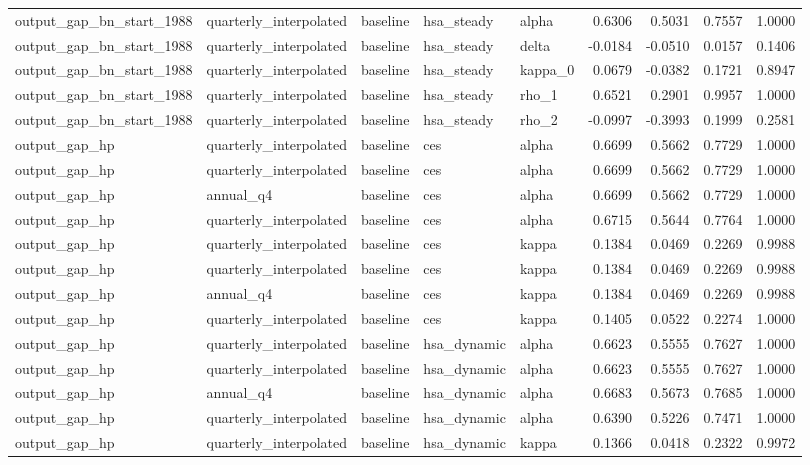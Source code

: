 \begin{tabular}{lllllrrrr}
output\_gap\_bn\_start\_1988 & quarterly\_interpolated & baseline & hsa\_steady & alpha & 0.6306 & 0.5031 & 0.7557 & 1.0000 \\
output\_gap\_bn\_start\_1988 & quarterly\_interpolated & baseline & hsa\_steady & delta & -0.0184 & -0.0510 & 0.0157 & 0.1406 \\
output\_gap\_bn\_start\_1988 & quarterly\_interpolated & baseline & hsa\_steady & kappa\_0 & 0.0679 & -0.0382 & 0.1721 & 0.8947 \\
output\_gap\_bn\_start\_1988 & quarterly\_interpolated & baseline & hsa\_steady & rho\_1 & 0.6521 & 0.2901 & 0.9957 & 1.0000 \\
output\_gap\_bn\_start\_1988 & quarterly\_interpolated & baseline & hsa\_steady & rho\_2 & -0.0997 & -0.3993 & 0.1999 & 0.2581 \\
output\_gap\_hp & quarterly\_interpolated & baseline & ces & alpha & 0.6699 & 0.5662 & 0.7729 & 1.0000 \\
output\_gap\_hp & quarterly\_interpolated & baseline & ces & alpha & 0.6699 & 0.5662 & 0.7729 & 1.0000 \\
output\_gap\_hp & annual\_q4 & baseline & ces & alpha & 0.6699 & 0.5662 & 0.7729 & 1.0000 \\
output\_gap\_hp & quarterly\_interpolated & baseline & ces & alpha & 0.6715 & 0.5644 & 0.7764 & 1.0000 \\
output\_gap\_hp & quarterly\_interpolated & baseline & ces & kappa & 0.1384 & 0.0469 & 0.2269 & 0.9988 \\
output\_gap\_hp & quarterly\_interpolated & baseline & ces & kappa & 0.1384 & 0.0469 & 0.2269 & 0.9988 \\
output\_gap\_hp & annual\_q4 & baseline & ces & kappa & 0.1384 & 0.0469 & 0.2269 & 0.9988 \\
output\_gap\_hp & quarterly\_interpolated & baseline & ces & kappa & 0.1405 & 0.0522 & 0.2274 & 1.0000 \\
output\_gap\_hp & quarterly\_interpolated & baseline & hsa\_dynamic & alpha & 0.6623 & 0.5555 & 0.7627 & 1.0000 \\
output\_gap\_hp & quarterly\_interpolated & baseline & hsa\_dynamic & alpha & 0.6623 & 0.5555 & 0.7627 & 1.0000 \\
output\_gap\_hp & annual\_q4 & baseline & hsa\_dynamic & alpha & 0.6683 & 0.5673 & 0.7685 & 1.0000 \\
output\_gap\_hp & quarterly\_interpolated & baseline & hsa\_dynamic & alpha & 0.6390 & 0.5226 & 0.7471 & 1.0000 \\
output\_gap\_hp & quarterly\_interpolated & baseline & hsa\_dynamic & kappa & 0.1366 & 0.0418 & 0.2322 & 0.9972 \\

\end{tabular}
